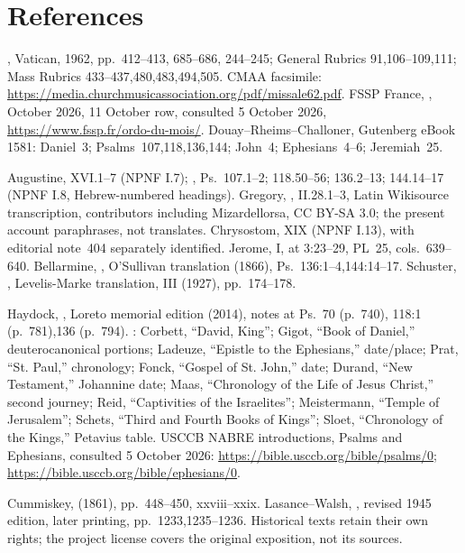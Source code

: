 \section{References}
\begin{description}[style=nextline,leftmargin=0pt,labelsep=0pt,itemsep=.35em]
\item[Appointments and text]
, Vatican, 1962, pp.~412--413, 685--686,
244--245; General Rubrics 91,106--109,111; Mass Rubrics
433--437,480,483,494,505. CMAA facsimile:
\url{https://media.churchmusicassociation.org/pdf/missale62.pdf}.
FSSP France, , October 2026, 11 October row,
consulted 5 October 2026, \url{https://www.fssp.fr/ordo-du-mois/}.
Douay--Rheims--Challoner, Gutenberg eBook 1581: Daniel~3;
Psalms~107,118,136,144; John~4; Ephesians~4--6; Jeremiah~25.

\item[Patristic and saintly commentary]
Augustine,  XVI.1--7 (NPNF I.7);
, Ps.~107.1--2; 118.50--56;
136.2--13; 144.14--17 (NPNF I.8, Hebrew-numbered headings).
Gregory, , II.28.1--3, Latin
Wikisource transcription, contributors including Mizardellorsa,
CC BY-SA 3.0; the present account paraphrases, not translates.
Chrysostom,  XIX (NPNF I.13), with
editorial note~404 separately identified. Jerome,  I, at 3:23--29, PL~25, cols.~639--640.
Bellarmine, , O'Sullivan translation
(1866), Ps.~136:1--4,144:14--17. Schuster, ,
Levelis-Marke translation, III (1927), pp.~174--178.

\item[Historical attribution and chronology]
Haydock, , Loreto memorial
edition (2014), notes at Ps.~70 (p.~740), 118:1 (p.~781),136 (p.~794).
: Corbett, ``David, King''; Gigot,
``Book of Daniel,'' deuterocanonical portions; Ladeuze, ``Epistle to
the Ephesians,'' date/place; Prat, ``St. Paul,'' chronology; Fonck,
``Gospel of St. John,'' date; Durand, ``New Testament,'' Johannine
date; Maas, ``Chronology of the Life of Jesus Christ,'' second journey;
Reid, ``Captivities of the Israelites''; Meistermann, ``Temple of
Jerusalem''; Schets, ``Third and Fourth Books of Kings''; Sloet,
``Chronology of the Kings,'' Petavius table. USCCB NABRE introductions,
Psalms and Ephesians, consulted 5 October 2026:
\url{https://bible.usccb.org/bible/psalms/0};
\url{https://bible.usccb.org/bible/ephesians/0}.

\item[Historical English prayers]
Cummiskey,  (1861),
pp.~448--450, xxviii--xxix. Lasance--Walsh, , revised 1945 edition, later printing, pp.~1233,1235--1236.
Historical texts retain their own rights; the project license covers
the original exposition, not its sources.
\end{description}
